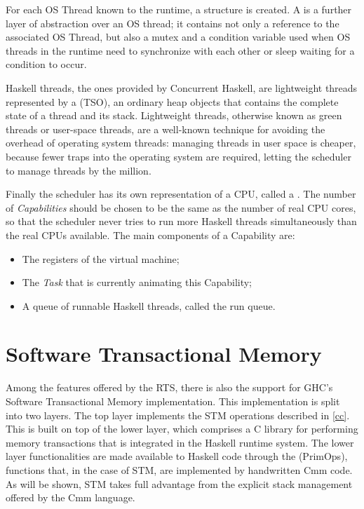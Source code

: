 For each OS Thread known to the runtime, a  structure is created. A  is a further layer of abstraction over an OS thread; it contains not only a reference to the associated OS Thread, but also a mutex and a condition variable used when OS threads in the runtime need to synchronize with each other or sleep waiting for a condition to occur.

Haskell threads, the ones provided by Concurrent Haskell, are lightweight threads represented by a  (TSO), an ordinary heap objects that contains the complete state of a thread and its stack.
Lightweight threads, otherwise known as green threads or user-space threads,
are a well-known technique for avoiding the overhead of operating system threads: managing threads in user space is cheaper, because fewer traps into the operating system are required, letting the scheduler to manage threads by the million.

Finally the scheduler has its own representation of a CPU, called a . The number of \emph{Capabilities} should be  chosen to be the same as the number of real CPU cores, so that the scheduler never tries to run more Haskell threads simultaneously than the real CPUs available.
The main components of a Capability are:
\begin{itemize}
\item The registers of the virtual machine;
\item The \emph{Task} that is currently animating this Capability;
\item A queue of runnable Haskell threads, called the run queue.
\end{itemize}

\section{Software Transactional Memory}

Among the features offered by the RTS, there is also the support for GHC's Software Transactional Memory implementation.
This implementation is split into two layers.
The top layer implements the STM operations described in \ref{cc}.
This is built on top of the lower layer, which comprises a C library for performing memory transactions that is integrated in the Haskell runtime system.
The lower layer functionalities are made available to Haskell code through the  (PrimOps), \ie functions that, in the case of STM, are implemented by handwritten Cmm code. 
As will be shown, STM takes full advantage from the explicit stack management offered by the Cmm language.

